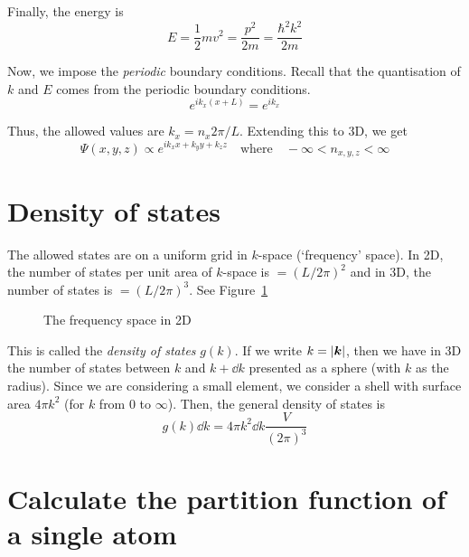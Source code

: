 \documentclass[12pt,chapterprefix=false,dvipsnames]{scrbook}
\theoremstyle{dotless}
\theoremstyle{definition}
\def\vec#1{{\ensuremath{\bm{{#1}}}}}
\begin{document}
Finally, the energy is
\begin{equation}
	E = \frac{1}{2}mv^2 = \frac{p^2}{2m} =
	\frac{\hbar^2 k^2}{2m}
\end{equation}

Now, we impose the \textit{periodic} boundary conditions.
Recall that the quantisation of $k$ and
$E$ comes from the periodic boundary
conditions.
\begin{equation}
    e^{i k_x \left(x+L\right)} =
    e^{ik_x}
\end{equation}

Thus, the allowed values are $k_x = n_x 2\pi / L$. Extending
this to 3D, we get
\begin{equation}
	\Psi\left(x,y,z\right)
	\propto
    e^{i k_x x + k_y y + k_z z}
	\hspace{1em}
	\mathrm{where}
	\hspace{1em}
	-\infty < n_{x,y,z} < \infty
\end{equation}

\section{Density of states}%
\label{sec:density_of_states}

The allowed states are on a uniform grid in
$k$-space (`frequency' space). In 2D, the
number of states per unit area of $k$-space
is $ = {\left( L/2\pi\right) }^2 $ and in 3D, the number of states is
$ = { \left( L/2\pi\right) }^3$. See Figure~\ref{fig:frequency_space}

\begin{figure}[htpb]
	\centering
	
	\caption{The frequency space in 2D}%
	\label{fig:frequency_space}
\end{figure}

This is called the \textit{density of states}
$g\left(k\right)$. If we write $k = \abs{ \vec{k}}$,
then we have in 3D the number of states between
$k$ and $k + \dd{k}$ presented as
a sphere (with $k$ as the radius). Since we
are considering a small element, we consider a shell with
surface area $4\pi k^2$ (for
$k$ from 0 to $\infty$).
Then, the general density of states is
\begin{equation}
	g\left(k\right)\dd{k} = 4\pi k^2
	\dd{k} \frac{V}{{\left(2\pi\right)}^3}
\end{equation}

\section{Calculate the partition function of a single atom}%
\label{sec:calculate_the_partition_function_of_a_single_atom}
\end{document}
